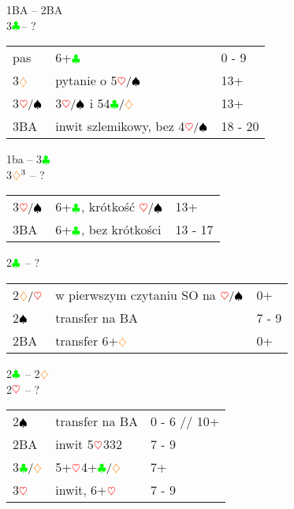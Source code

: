\documentclass[a4paper,11pt]{article}
\newcommand{\CC}{\textcolor{green}\clubsuit}
\newcommand{\DD}{\textcolor{orange}\diamondsuit}
\newcommand{\HH}{\textcolor{red}\heartsuit}
\newcommand{\PP}{\textcolor{black}\spadesuit}
\begin{document}

\begin{center}\LARGE{1BA -- 2BA\\3$\CC$\footnotemark[2] -- ?}\\
\end{center}
\begin{tabular}{p{2cm} p{10cm} l}
	pas & 6+$\CC$ & 0 - 9\\
	3$\DD$ & pytanie o 5$\HH/\PP$ & 13+\\
	3$\HH/\PP$ & 3$\HH/\PP$ i 54$\CC/\DD$ & 13+\\
	3BA & inwit szlemikowy, bez 4$\HH/\PP$ & 18 - 20\\
\end{tabular}


\begin{center}\LARGE{1ba -- 3$\CC$\\3$\DD\footnotemark[3]$ -- ?}
\end{center}
\begin{tabular}{p{2cm} p{10cm} l}
	3$\HH/\PP$ & 6+$\CC$, krótkość $\HH/\PP$ & 13+\\
	3BA & 6+$\CC$, bez krótkości & 13 - 17\\
\end{tabular}

\newpage

\begin{center}\LARGE{2$\CC$ -- ?}
\end{center}
\begin{tabular}{p{2cm} p{10cm} l}
	2$\DD/\HH$ & w pierwszym czytaniu SO na $\HH/\PP$ & 0+\\
	2$\PP$ & transfer na BA & 7 - 9\\
	2BA & transfer 6+$\DD$ & 0+\\
\end{tabular}
	

\begin{center}\LARGE{2$\CC$ -- 2$\DD$\\2$\HH$ -- ?}
\end{center}
\begin{tabular}{p{2cm} p{10cm} l}
	2$\PP$ & transfer na BA & 0 - 6 // 10+ \\
	2BA & inwit 5$\HH$332\footnotemark[1] & 7 - 9\\
	3$\CC/\DD$ & 5+$\HH$4+$\CC/\DD$ & 7+\\
	3$\HH$ & inwit, 6+$\HH$ & 7 - 9\\
\end{tabular}
	
\end{document}
